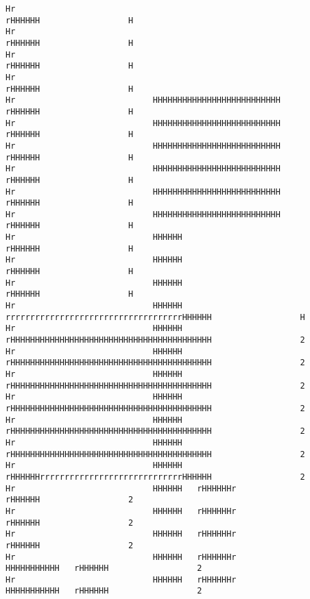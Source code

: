 \documentclass[10pt,a4paper]{article}
\begin{document}
{\begin{verbatim}
Hr                                                                        rHHHHHH                  H
Hr                                                                        rHHHHHH                  H
Hr                                                                        rHHHHHH                  H
Hr                                                                        rHHHHHH                  H
Hr                            HHHHHHHHHHHHHHHHHHHHHHHHHH                  rHHHHHH                  H
Hr                            HHHHHHHHHHHHHHHHHHHHHHHHHH                  rHHHHHH                  H
Hr                            HHHHHHHHHHHHHHHHHHHHHHHHHH                  rHHHHHH                  H
Hr                            HHHHHHHHHHHHHHHHHHHHHHHHHH                  rHHHHHH                  H
Hr                            HHHHHHHHHHHHHHHHHHHHHHHHHH                  rHHHHHH                  H
Hr                            HHHHHHHHHHHHHHHHHHHHHHHHHH                  rHHHHHH                  H
Hr                            HHHHHH                                      rHHHHHH                  H
Hr                            HHHHHH                                      rHHHHHH                  H
Hr                            HHHHHH                                      rHHHHHH                  H
Hr                            HHHHHH   rrrrrrrrrrrrrrrrrrrrrrrrrrrrrrrrrrrrHHHHHH                  H
Hr                            HHHHHH   rHHHHHHHHHHHHHHHHHHHHHHHHHHHHHHHHHHHHHHHHH                  2
Hr                            HHHHHH   rHHHHHHHHHHHHHHHHHHHHHHHHHHHHHHHHHHHHHHHHH                  2
Hr                            HHHHHH   rHHHHHHHHHHHHHHHHHHHHHHHHHHHHHHHHHHHHHHHHH                  2
Hr                            HHHHHH   rHHHHHHHHHHHHHHHHHHHHHHHHHHHHHHHHHHHHHHHHH                  2
Hr                            HHHHHH   rHHHHHHHHHHHHHHHHHHHHHHHHHHHHHHHHHHHHHHHHH                  2
Hr                            HHHHHH   rHHHHHHHHHHHHHHHHHHHHHHHHHHHHHHHHHHHHHHHHH                  2
Hr                            HHHHHH   rHHHHHHrrrrrrrrrrrrrrrrrrrrrrrrrrrrrHHHHHH                  2
Hr                            HHHHHH   rHHHHHHr                           rHHHHHH                  2
Hr                            HHHHHH   rHHHHHHr                           rHHHHHH                  2
Hr                            HHHHHH   rHHHHHHr                           rHHHHHH                  2
Hr                            HHHHHH   rHHHHHHr             HHHHHHHHHHH   rHHHHHH                  2
Hr                            HHHHHH   rHHHHHHr             HHHHHHHHHHH   rHHHHHH                  2

\end{verbatim}}
\end{document}
